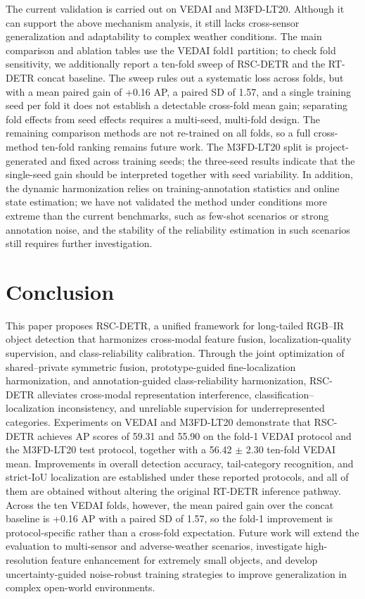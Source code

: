 \documentclass[letterpaper,journal]{IEEEtran}
\begin{document}
The current validation is carried out on VEDAI and M3FD-LT20. Although it can support the above mechanism analysis, it still lacks cross-sensor generalization and adaptability to complex weather conditions. The main comparison and ablation tables use the VEDAI fold1 partition; to check fold sensitivity, we additionally report a ten-fold sweep of RSC-DETR and the RT-DETR concat baseline. The sweep rules out a systematic loss across folds, but with a mean paired gain of +0.16 AP, a paired SD of 1.57, and a single training seed per fold it does not establish a detectable cross-fold mean gain; separating fold effects from seed effects requires a multi-seed, multi-fold design. The remaining comparison methods are not re-trained on all folds, so a full cross-method ten-fold ranking remains future work. The M3FD-LT20 split is project-generated and fixed across training seeds; the three-seed results indicate that the single-seed gain should be interpreted together with seed variability. In addition, the dynamic harmonization relies on training-annotation statistics and online state estimation; we have not validated the method under conditions more extreme than the current benchmarks, such as few-shot scenarios or strong annotation noise, and the stability of the reliability estimation in such scenarios still requires further investigation.

\section{Conclusion}
This paper proposes RSC-DETR, a unified framework for long-tailed RGB--IR object detection that harmonizes cross-modal feature fusion, localization-quality supervision, and class-reliability calibration. Through the joint optimization of shared--private symmetric fusion, prototype-guided fine-localization harmonization, and annotation-guided class-reliability harmonization, RSC-DETR alleviates cross-modal representation interference, classification--localization inconsistency, and unreliable supervision for underrepresented categories. Experiments on VEDAI and M3FD-LT20 demonstrate that RSC-DETR achieves AP scores of 59.31 and 55.90 on the fold-1 VEDAI protocol and the M3FD-LT20 test protocol, together with a 56.42 $\pm$ 2.30 ten-fold VEDAI mean. Improvements in overall detection accuracy, tail-category recognition, and strict-IoU localization are established under these reported protocols, and all of them are obtained without altering the original RT-DETR inference pathway. Across the ten VEDAI folds, however, the mean paired gain over the concat baseline is +0.16 AP with a paired SD of 1.57, so the fold-1 improvement is protocol-specific rather than a cross-fold expectation. Future work will extend the evaluation to multi-sensor and adverse-weather scenarios, investigate high-resolution feature enhancement for extremely small objects, and develop uncertainty-guided noise-robust training strategies to improve generalization in complex open-world environments.
\end{document}
